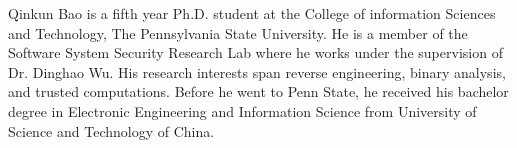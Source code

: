 
Qinkun Bao is a fifth year Ph.D. student at the College of information Sciences
and Technology, The Pennsylvania State University. He is a member of the Software 
System Security Research Lab where he works under the supervision of Dr. Dinghao Wu.
His research interests span reverse engineering, binary analysis, and trusted computations. Before he went to Penn State, he received his bachelor degree in Electronic Engineering and Information Science from University of Science and Technology of China.